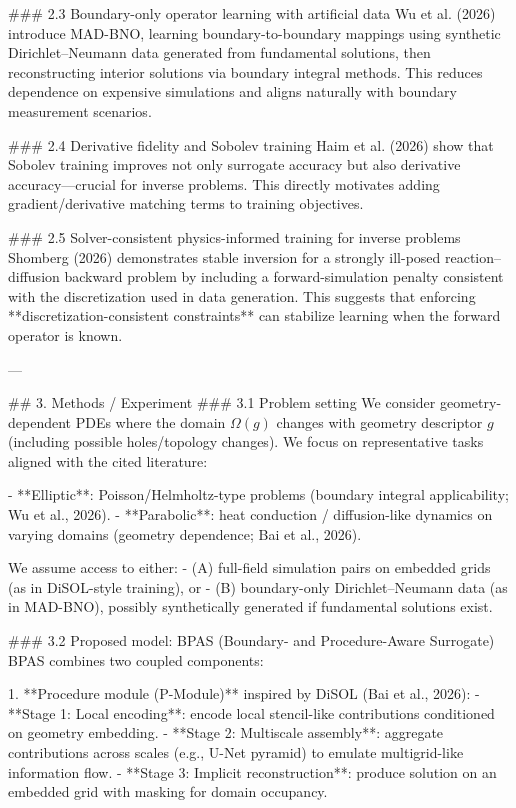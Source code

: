### 2.3 Boundary-only operator learning with artificial data
Wu et al. (2026) introduce MAD-BNO, learning boundary-to-boundary mappings using synthetic Dirichlet–Neumann data generated from fundamental solutions, then reconstructing interior solutions via boundary integral methods. This reduces dependence on expensive simulations and aligns naturally with boundary measurement scenarios.

### 2.4 Derivative fidelity and Sobolev training
Haim et al. (2026) show that Sobolev training improves not only surrogate accuracy but also derivative accuracy—crucial for inverse problems. This directly motivates adding gradient/derivative matching terms to training objectives.

### 2.5 Solver-consistent physics-informed training for inverse problems
Shomberg (2026) demonstrates stable inversion for a strongly ill-posed reaction–diffusion backward problem by including a forward-simulation penalty consistent with the discretization used in data generation. This suggests that enforcing **discretization-consistent constraints** can stabilize learning when the forward operator is known.

---

## 3. Methods / Experiment
### 3.1 Problem setting
We consider geometry-dependent PDEs where the domain \( \Omega(g) \) changes with geometry descriptor \(g\) (including possible holes/topology changes). We focus on representative tasks aligned with the cited literature:

- **Elliptic**: Poisson/Helmholtz-type problems (boundary integral applicability; Wu et al., 2026).
- **Parabolic**: heat conduction / diffusion-like dynamics on varying domains (geometry dependence; Bai et al., 2026).

We assume access to either:
- (A) full-field simulation pairs on embedded grids (as in DiSOL-style training), or
- (B) boundary-only Dirichlet–Neumann data (as in MAD-BNO), possibly synthetically generated if fundamental solutions exist.

### 3.2 Proposed model: BPAS (Boundary- and Procedure-Aware Surrogate)
BPAS combines two coupled components:

1. **Procedure module (P-Module)** inspired by DiSOL (Bai et al., 2026):
   - **Stage 1: Local encoding**: encode local stencil-like contributions conditioned on geometry embedding.
   - **Stage 2: Multiscale assembly**: aggregate contributions across scales (e.g., U-Net pyramid) to emulate multigrid-like information flow.
   - **Stage 3: Implicit reconstruction**: produce solution on an embedded grid with masking for domain occupancy.

